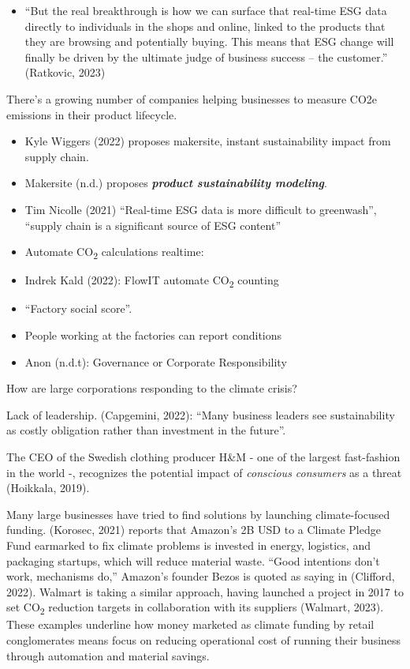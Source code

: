 \documentclass[
  letterpaper,
  DIV=11,
  numbers=noendperiod]{scrartcl}
\providecommand{\tightlist}{%
  \setlength{\itemsep}{0pt}\setlength{\parskip}{0pt}}\usepackage{longtable,booktabs,array}
\begin{document}
\begin{itemize}
\tightlist
\item
  ``But the real breakthrough is how we can surface that real-time ESG
  data directly to individuals in the shops and online, linked to the
  products that they are browsing and potentially buying. This means
  that ESG change will finally be driven by the ultimate judge of
  business success -- the customer.'' (Ratkovic, 2023)
\end{itemize}

There's a growing number of companies helping businesses to measure CO2e
emissions in their product lifecycle.

\begin{itemize}
\item
  Kyle Wiggers (2022) proposes makersite, instant sustainability impact
  from supply chain.
\item
  Makersite (n.d.) proposes \textbf{\emph{product sustainability
  modeling}}.
\item
  Tim Nicolle (2021) ``Real-time ESG data is more difficult to
  greenwash'', ``supply chain is a significant source of ESG content''
\item
  Automate CO\textsubscript{2} calculations realtime:
\item
  Indrek Kald (2022): FlowIT automate CO\textsubscript{2} counting
\item
  ``Factory social score''.
\item
  People working at the factories can report conditions
\item
  Anon (n.d.t): Governance or Corporate Responsibility
\end{itemize}

How are large corporations responding to the climate crisis?

Lack of leadership. (Capgemini, 2022): ``Many business leaders see
sustainability as costly obligation rather than investment in the
future''.

The CEO of the Swedish clothing producer H\&M - one of the largest
fast-fashion in the world -, recognizes the potential impact of
\emph{conscious consumers} as a threat (Hoikkala, 2019).

Many large businesses have tried to find solutions by launching
climate-focused funding. (Korosec, 2021) reports that Amazon's 2B USD to
a Climate Pledge Fund earmarked to fix climate problems is invested in
energy, logistics, and packaging startups, which will reduce material
waste. ``Good intentions don't work, mechanisms do,'' Amazon's founder
Bezos is quoted as saying in (Clifford, 2022). Walmart is taking a
similar approach, having launched a project in 2017 to set
CO\textsubscript{2} reduction targets in collaboration with its
suppliers (Walmart, 2023). These examples underline how money marketed
as climate funding by retail conglomerates means focus on reducing
operational cost of running their business through automation and
material savings.
\end{document}
